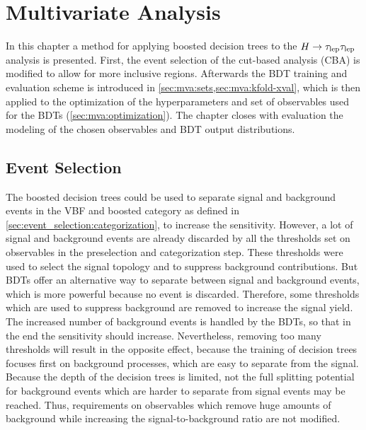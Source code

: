 \chapter{Multivariate Analysis}\label{cha:mva}

In this chapter a method for applying boosted decision trees to the $H \to \tau_\text{lep} \tau_\text{lep}$ analysis is presented.
First, the event selection of the cut-based analysis (CBA) is modified to allow for more inclusive regions.
Afterwards the BDT training and evaluation scheme is introduced in \cref{sec:mva:sets,sec:mva:kfold-xval},
which is then applied to the optimization of the hyperparameters and set of observables used for the BDTs (\cref{sec:mva:optimization}).
The chapter closes with evaluation the modeling of the chosen observables and BDT output distributions.

\section{Event Selection}\label{sec:mva:event_selection}

The boosted decision trees could be used to separate signal and background events in the VBF and boosted category as defined in \cref{sec:event_selection:categorization},
to increase the sensitivity.
However, a lot of signal and background events are already discarded by all the thresholds set on observables in the preselection and categorization step.
These thresholds were used to select the signal topology and to suppress background contributions.
But BDTs offer an alternative way to separate between signal and background events, which is more powerful because no event is
discarded.
Therefore, some thresholds which are used to suppress background are removed to increase the signal yield.
The increased number of background events is handled by the BDTs, so that in the end the sensitivity should increase.
Nevertheless, removing too many thresholds will result in the opposite effect, because the training of decision trees
focuses first on background processes, which are easy to separate from the signal.
Because the depth of the decision trees is limited, not the full splitting potential for background events which are harder to separate from signal events may be reached.
Thus, requirements on observables which remove huge amounts of background while increasing the signal-to-background ratio are not modified.

